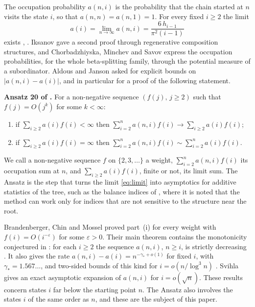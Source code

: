 \documentclass[11pt]{amsart}
\theoremstyle{remark}
\numberwithin{equation}{section}
\begin{document}
The occupation probability $a(n,i)$ is the probability that the chain started at $n$ visits the state $i$, so that
$a(n,n)=a(n,1)=1$. For every fixed $i\ge2$ the limit
\begin{equation}\label{eq:limit}
a(i)=\lim_{n\to\infty}a(n,i)=\frac{6\,h_{i-1}}{\pi^2(i-1)}
\end{equation}
exists \cite[Theorem~18]{AJ}, \cite{AJL}. Iksanov \cite{I} gave a second proof through regenerative composition
structures, and Chorbadzhiyska, Minchev and Savov \cite{CMS} express the occupation probabilities, for the whole
beta-splitting family, through the potential measure of a subordinator. Aldous and Janson
\cite[Section~4.7, Open Problem~8]{AJ} asked for explicit bounds on $|a(n,i)-a(i)|$, and in particular for a proof of
the following statement.

\medskip\noindent\textbf{Ansatz 20 of \cite{AJ}.} For a non-negative sequence $(f(j),\,j\ge2)$ such that $f(j)=O(j^k)$
for some $k<\infty$:
\begin{enumerate}
\item[(i)] if $\sum_{i\ge2}a(i)f(i)<\infty$ then $\sum_{i=2}^n a(n,i)f(i)\to\sum_{i\ge2}a(i)f(i)$;
\item[(ii)] if $\sum_{i\ge2}a(i)f(i)=\infty$ then $\sum_{i=2}^n a(n,i)f(i)\sim\sum_{i=2}^n a(i)f(i)$.
\end{enumerate}

\medskip
We call a non-negative sequence $f$ on $\{2,3,\dots\}$ a weight, $\sum_{i=2}^n a(n,i)f(i)$ its occupation sum at $n$, and
$\sum_{i\ge2}a(i)f(i)$, finite or not, its limit sum. The Ansatz is the step that turns the limit \eqref{eq:limit} into
asymptotics for additive statistics of the tree, such as the balance indices of \cite[Section~4.9]{AJ}, where it is
noted that the method can work only for indices that are not sensitive to the structure near the root.

Brandenberger, Chin and Mossel \cite{BCM} proved part~(i) for every weight with $f(i)=O(i^{-\varepsilon})$ for some
$\varepsilon>0$. Their main theorem contains the monotonicity conjectured in \cite{AP}: for each $i\ge2$ the sequence
$a(n,i)$, $n\ge i$, is strictly decreasing \cite[Theorem~1.1(i)]{BCM}. It also gives the rate
$a(n,i)-a(i)=n^{-\gamma_*+o(1)}$ for fixed $i$, with $\gamma_*=1.567\dots$, and two-sided bounds of this kind for
$i=o(n/\log^3n)$ \cite[(1.6), (1.7)]{BCM}. Svihla \cite{S} gives an exact asymptotic expansion of $a(n,i)$ for
$i=o(\sqrt n)$. These results concern states $i$ far below the starting point $n$. The Ansatz also involves the states
$i$ of the same order as $n$, and these are the subject of this paper.
\end{document}
